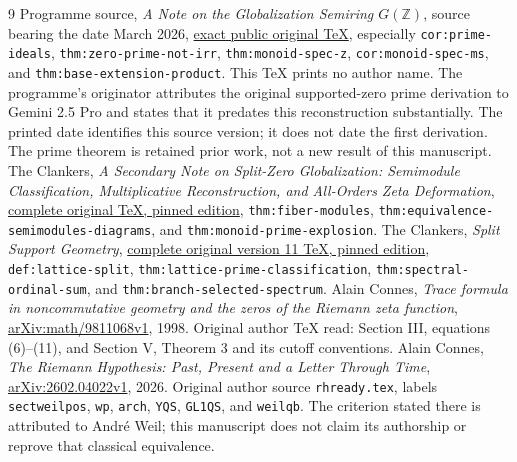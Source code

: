 \documentclass[11pt,a4paper]{article}
\theoremstyle{definition}\newtheorem{definition}[theorem]{Definition}
\newcommand{\Z}{\mathbb Z}\newcommand{\Q}{\mathbb Q}
\begin{document}
\begin{thebibliography}{9}
 Programme source, \emph{A Note on the Globalization Semiring $G(\Z)$}, source bearing the date March 2026, \href{https://github.com/KokunoYumeto/zeta-function-research-reader/blob/d2f0020a7c446f429682925c1c682d99ba86a4cc/workbenches/splitzero-tandem/foundations/globalization-semiring/globalization_note.tex}{exact public original TeX}, especially \texttt{cor:prime-ideals}, \texttt{thm:zero-prime-not-irr}, \texttt{thm:monoid-spec-z}, \texttt{cor:monoid-spec-ms}, and \texttt{thm:base-extension-product}. This TeX prints no author name. The programme's originator attributes the original supported-zero prime derivation to Gemini 2.5 Pro and states that it predates this reconstruction substantially. The printed date identifies this source version; it does not date the first derivation. The prime theorem is retained prior work, not a new result of this manuscript.
 The Clankers, \emph{A Secondary Note on Split-Zero Globalization: Semimodule Classification, Multiplicative Reconstruction, and All-Orders Zeta Deformation}, \href{https://github.com/KokunoYumeto/zeta-function-research-reader/blob/4f0bccd3a0e9d159dbb379bfbe4835054abc298d/workbenches/splitzero-tandem/continuations/20260919-corpus-cohomology-metric-receivers/corpus_sources/split_zero_secondary_note.tex}{complete original TeX, pinned edition}, \texttt{thm:fiber-modules}, \texttt{thm:equivalence-semimodules-diagrams}, and \texttt{thm:monoid-prime-explosion}.
 The Clankers, \emph{Split Support Geometry}, \href{https://github.com/KokunoYumeto/zeta-function-research-reader/blob/a2851f9eb352e7e4376bc629de86fa4ed9c1c434/workbenches/splitzero-tandem/foundations/split-support-geometry-v11/split_support_geometry_arithmetic_curve_v11.tex}{complete original version 11 TeX, pinned edition}, \texttt{def:lattice-split}, \texttt{thm:lattice-prime-classification}, \texttt{thm:spectral-ordinal-sum}, and \texttt{thm:branch-selected-spectrum}.
 Alain Connes, \emph{Trace formula in noncommutative geometry and the zeros of the Riemann zeta function}, \href{https://arxiv.org/abs/math/9811068v1}{arXiv:math/9811068v1}, 1998. Original author TeX read: Section III, equations (6)--(11), and Section V, Theorem 3 and its cutoff conventions.
 Alain Connes, \emph{The Riemann Hypothesis: Past, Present and a Letter Through Time}, \href{https://arxiv.org/abs/2602.04022v1}{arXiv:2602.04022v1}, 2026. Original author source \texttt{rhready.tex}, labels \texttt{sectweilpos}, \texttt{wp}, \texttt{arch}, \texttt{YQS}, \texttt{GL1QS}, and \texttt{weilqb}. The criterion stated there is attributed to Andr\'e Weil; this manuscript does not claim its authorship or reprove that classical equivalence.

\end{thebibliography}
\end{document}

